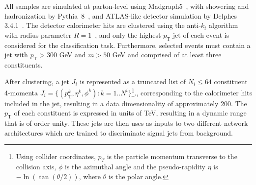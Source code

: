 \documentclass[reprint,nofootinbib,...]{revtex4-1}
\newcommand{\nconst}{64}       %
\newcommand{\JetPtMin}{300}    %
\newcommand{\JetMassMin}{50}   %
\newcommand{\pt}{p_\mathrm{T}} %
\begin{document}
All samples are simulated at parton-level using Madgraph5~\cite{Alwall:2014hca}, with showering and hadronization by Pythia~8~\cite{Sjostrand:2006za,Sjostrand:2007gs}, and ATLAS-like detector simulation by Delphes 3.4.1~\cite{deFavereau:2013fsa}.
The detector calorimeter hits are clustered using the anti-$k_t$ algorithm with radius parameter $R=1$~\cite{Cacciari:2008gp}, and only the highest-$\pt$ jet of each event is considered for the classification task.
Furthermore, selected events must contain a jet with $\pt>\JetPtMin$ GeV and $m>\JetMassMin$ GeV and comprised of at least three constituents.

After clustering, a jet $J_i$ is represented as a truncated list of $N_i\leq\nconst$ constituent 4-momenta $J_i = \{(\pt^k, \eta^k,\phi^k) \colon k = 1..N^i\}$\footnote{Using collider coordinates, $p_T$ is the particle momentum transverse to the collision axis, $\phi$ is the azimuthal angle and the pseudo-rapidity $\eta$ is $-\ln(\tan(\theta/2))$, where $\theta$ is the polar angle.}., corresponding to the calorimeter hits included in the jet, resulting in a data dimensionality of approximately 200.
The $\pt$ of each constituent is expressed in units of TeV, resulting in a dynamic range that is of order unity.
These jets are then uses as inputs to two different network architectures which are trained to discriminate signal jets from background.

\end{document}
